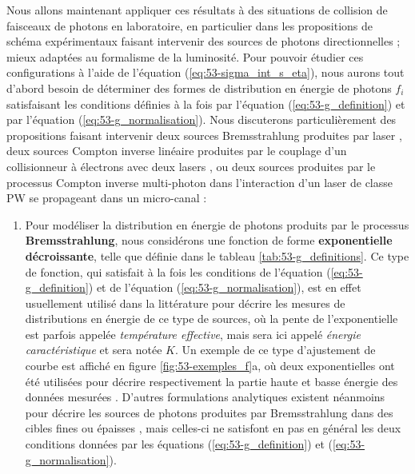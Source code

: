 \begin{refsection}
Nous allons maintenant appliquer ces résultats à des situations de collision de faisceaux de photons en laboratoire, en particulier dans les propositions de schéma expérimentaux faisant intervenir des sources de photons directionnelles ; mieux adaptées au formalisme de la luminosité. Pour pouvoir étudier ces configurations à l'aide de l'équation (\ref{eq:53-sigma_int_s_eta}), nous aurons tout d'abord besoin de déterminer des formes de distribution en énergie de photons $f_i$ satisfaisant les conditions définies à la fois par l'équation (\ref{eq:53-g_definition}) et par l'équation (\ref{eq:53-g_normalisation}). Nous discuterons particulièrement des propositions faisant intervenir deux sources Bremsstrahlung produites par laser \parencite{ribeyre_2016}, deux sources Compton inverse linéaire produites par le couplage d'un collisionneur à électrons avec deux lasers \parencite{drebot_2017a}, ou deux sources produites par le processus Compton inverse multi-photon dans l'interaction d'un laser de classe PW se propageant dans un micro-canal \parencite{wang_2020} :
\begin{enumerate}[label=\roman*. ]
    \item Pour modéliser la distribution en énergie de photons produits par le processus \textbf{Bremsstrahlung}, nous considérons une fonction de forme \textbf{exponentielle décroissante}, telle que définie dans le tableau \ref{tab:53-g_definitions}. Ce type de fonction, qui satisfait à la fois les conditions de l'équation (\ref{eq:53-g_definition}) et de l'équation (\ref{eq:53-g_normalisation}), est en effet usuellement utilisé dans la littérature \parencite{norreys_1999, zulick_2013, henderson_2014} pour décrire les mesures de distributions en énergie de ce type de sources, où la pente de l'exponentielle est parfois appelée \textit{température effective}, mais sera ici appelé \textit{énergie caractéristique} et sera notée $K$. Un exemple de ce type d'ajustement de courbe est affiché en figure \ref{fig:53-exemples_f}a, où deux exponentielles ont été utilisées pour décrire respectivement la partie haute et basse énergie des données mesurées \parencite{zulick_2013}. D'autres formulations analytiques existent néanmoins pour décrire les sources de photons produites par Bremsstrahlung dans des cibles fines \parencite{shkolnikov_1997} ou épaisses \parencite{matthews_1973, findlay_1989, tsai_1974}, mais celles-ci ne satisfont en pas en général les deux conditions données par les équations (\ref{eq:53-g_definition}) et (\ref{eq:53-g_normalisation}).
    

\end{enumerate}
\end{refsection}
